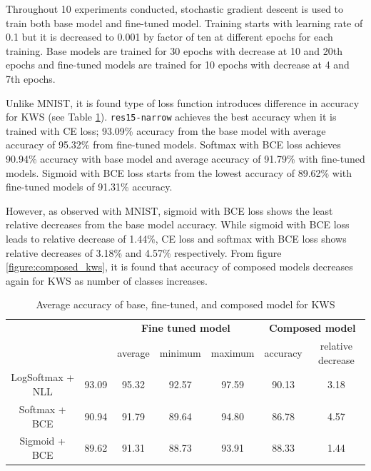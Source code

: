 \documentclass{article}
\begin{document}
Throughout 10 experiments conducted, stochastic gradient descent is used to train both base model and fine-tuned model. Training starts with learning rate of 0.1 but it is decreased to 0.001 by factor of ten at different epochs for each training. Base models are trained for 30 epochs with decrease at 10 and 20th epochs and fine-tuned models are trained for 10 epochs with decrease at 4 and 7th epochs.

Unlike MNIST, it is found type of loss function introduces difference in accuracy for KWS (see Table \ref{table:kws}). \texttt{res15-narrow} achieves the best accuracy when it is trained with CE loss; 93.09\% accuracy from the base model with average accuracy of 95.32\% from fine-tuned models. Softmax with BCE loss achieves 90.94\% accuracy with base model and average accuracy of 91.79\% with fine-tuned models. Sigmoid with BCE loss starts from the lowest accuracy of 89.62\% with fine-tuned models of 91.31\% accuracy.

However, as observed with MNIST, sigmoid with BCE loss shows the least relative decreases from the base model accuracy. While sigmoid with BCE loss leads to relative decrease of 1.44\%, CE loss and softmax with BCE loss shows relative decreases of 3.18\% and 4.57\% respectively. From figure \ref{figure:composed_kws}, it is found that accuracy of composed models decreases again for KWS as number of classes increases.

\begin{table}[t]
    \centering
    \begin{tabular}{ccccccc}
        \toprule[1pt]
        \multirow{2}{*}{\raisebox{-3\heavyrulewidth}{\bf Loss function}} &
        \multirow{2}{*}{\raisebox{-3\heavyrulewidth}{\bf Base model}} &
        \multicolumn{3}{c}{\bf Fine tuned model } &
        \multicolumn{2}{c}{\bf Composed model } \\
        \cmidrule(lr){3-5}
        \cmidrule(lr){6-7}
        & & average & minimum & maximum & accuracy & relative decrease \\
        \midrule
        LogSoftmax + NLL & 93.09 & 95.32 & 92.57 & 97.59 & 90.13 & 3.18 \\
        Softmax + BCE & 90.94 & 91.79 & 89.64 & 94.80 & 86.78 & 4.57 \\
        Sigmoid + BCE & 89.62 & 91.31 & 88.73 & 93.91 & 88.33 & 1.44 \\
        \bottomrule[1pt]
    \end{tabular}
    \caption{Average accuracy of base, fine-tuned, and composed model for KWS}
    \label{table:kws}
\end{table}
\end{document}
